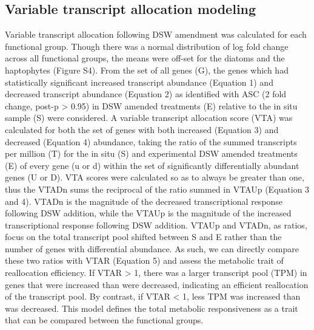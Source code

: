\subsection{Variable transcript allocation modeling} 
Variable transcript allocation following DSW amendment was calculated for each functional group. Though there was a normal distribution of log fold change across all functional groups, the means were off-set for the diatoms and the haptophytes (Figure S4). From the set of all genes (G), the genes which had statistically significant increased transcript abundance (Equation 1) and decreased transcript abundance (Equation 2) as identified with ASC (2 fold change, post-p > 0.95) \citep{Wu2010} in DSW amended treatments (E) relative to the in situ sample (S) were considered. A variable transcript allocation score (VTA) was calculated for both the set of genes with both increased (Equation 3) and decreased (Equation 4) abundance, taking the ratio of the summed transcripts per million (T) for the in situ (S) and experimental DSW amended treatments (E) of every gene (u or d) within the set of significantly differentially abundant genes (U or D). VTA scores were calculated so as to always be greater than one, thus the VTADn sums the reciprocal of the ratio summed in VTAUp (Equation 3 and 4). VTADn is the magnitude of the decreased transcriptional response following DSW addition, while the VTAUp is the magnitude of the increased transcriptional response following DSW addition. VTAUp and VTADn, as ratios, focus on the total transcript pool shifted between S and E rather than the number of genes with differential abundance. As such, we can directly compare these two ratios with VTAR (Equation 5) and assess the metabolic trait of reallocation efficiency. If VTAR > 1, there was a larger transcript pool (TPM) in genes that were increased than were decreased, indicating an efficient reallocation of the transcript pool. By contrast, if VTAR < 1, less TPM was increased than was decreased. This model defines the total metabolic responsiveness as a trait that can be compared between the functional groups. \par

